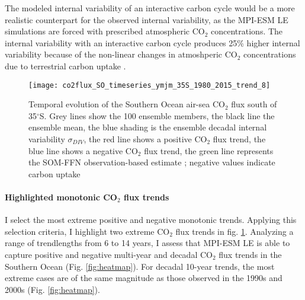 \documentclass[12pt]{article}
\begin{document}
The modeled internal variability of an interactive carbon cycle would be a more realistic counterpart for the observed internal variability, as the MPI-ESM LE simulations are forced with prescribed atmospheric CO$_2$ concentrations. The internal variability with an interactive carbon cycle produces 25\% higher internal variability because of the non-linear changes in atmoshperic CO$_2$ concentrations due to terrestrial carbon uptake \citep{Ilyina2013}.


\begin{figure}%
	\texttt{[image: co2flux\_SO\_timeseries\_ymjm\_35S\_1980\_2015\_trend\_8]}
	\caption{Temporal evolution of the Southern Ocean air-sea CO$_2$ flux south of 35$^\circ$S. Grey lines show the 100 ensemble members, the black line the ensemble mean, the blue shading is the ensemble decadal internal variability $\sigma_{DIV}$, the red line shows a positive CO$_2$ flux trend, the blue line shows a negative CO$_2$ flux trend, the green line represents the SOM-FFN observation-based estimate \citep{landschuetzer2015}; negative values indicate carbon uptake}
	\label{fig:evolution_southern_ocean_carbon_sink}
\end{figure}



\paragraph{Highlighted monotonic CO$_2$ flux trends}
I select the most extreme positive and negative monotonic trends. 
Applying this selection criteria, I highlight two extreme CO$_2$ flux trends in fig. \ref{fig:evolution_southern_ocean_carbon_sink}. Analyzing a range of trendlengths from 6 to 14 years, I assess that MPI-ESM LE is able to capture positive and negative multi-year and decadal CO$_2$ flux trends in the Southern Ocean (Fig. \ref{fig:heatmap}). For decadal 10-year trends, the most extreme cases are of the same magnitude as those observed in the 1990s and 2000s  \citep{LeQuere2007,landschuetzer2015} (Fig. \ref{fig:heatmap}). 
\end{document}

